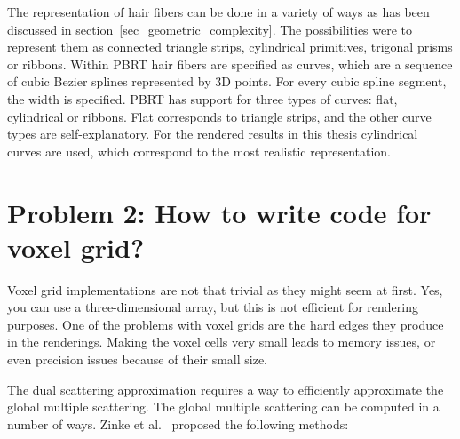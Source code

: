\documentclass[11pt,a4paper]{report}
\begin{document}
The representation of hair fibers can be done in a variety of ways as has been discussed in section~\ref{sec_geometric_complexity}. The possibilities were to represent them as connected triangle strips, cylindrical primitives, trigonal prisms or ribbons. Within PBRT hair fibers are specified as curves, which are a sequence of cubic Bezier splines represented by 3D points. For every cubic spline segment, the width is specified. PBRT has support for three types of curves: flat, cylindrical or ribbons. Flat corresponds to triangle strips, and the other curve types are self-explanatory. For the rendered results in this thesis cylindrical curves are used, which correspond to the most realistic representation.

\section{Problem 2: How to write code for voxel grid?}

Voxel grid implementations are not that trivial as they might seem at first. Yes, you can use a three-dimensional array, but this is not efficient for rendering purposes. One of the problems with voxel grids are the hard edges they produce in the renderings. Making the voxel cells very small leads to memory issues, or even precision issues because of their small size.

The dual scattering approximation requires a way to efficiently approximate the global multiple scattering. The global multiple scattering can be computed in a number of ways. Zinke et al.~\cite{zinke} proposed the following methods:
\end{document}
